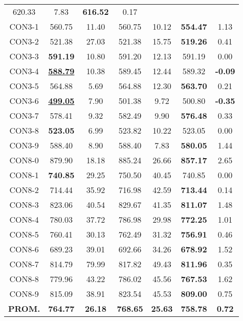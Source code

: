 \begin{table}[ht]
\begin{tabular}{c c c c c c c}
620.33 & 7.83 & \bf{616.52} & 
0.17\\CON3-1 & 560.75 & 11.40 & 
560.75 & 10.12 & \bf{554.47} & 
1.13\\CON3-2 & 521.38 & 27.03 & 
521.38 & 15.75 & \bf{519.26} & 
0.41\\CON3-3 & \bf{591.19} & 10.80 & 
591.20 & 12.13 & 591.19 & 0.00\\
CON3-4 & \bf{\underline{588.79}} & 10.38 & 
589.45 & 12.44 & 589.32 & 
\bf{-0.09}\\CON3-5 & 564.88 & 5.69 & 
564.88 & 12.30 & \bf{563.70} & 
0.21\\CON3-6 & \bf{\underline{499.05}} & 7.90 & 
501.38 & 9.72 & 500.80 & 
\bf{-0.35}\\CON3-7 & 578.41 & 9.32 & 
582.49 & 9.90 & \bf{576.48} & 
0.33\\CON3-8 & \bf{523.05} & 6.99 & 
523.82 & 10.22 & 523.05 & 0.00\\
CON3-9 & 588.40 & 8.90 & 
588.40 & 7.83 & \bf{580.05} & 
1.44\\CON8-0 & 879.90 & 18.18 & 
885.24 & 26.66 & \bf{857.17} & 
2.65\\CON8-1 & \bf{740.85} & 29.25 & 
750.50 & 40.45 & 740.85 & 0.00\\
CON8-2 & 714.44 & 35.92 & 
716.98 & 42.59 & \bf{713.44} & 
0.14\\CON8-3 & 823.06 & 40.54 & 
829.67 & 41.35 & \bf{811.07} & 
1.48\\CON8-4 & 780.03 & 37.72 & 
786.98 & 29.98 & \bf{772.25} & 
1.01\\CON8-5 & 760.41 & 30.13 & 
762.49 & 31.32 & \bf{756.91} & 
0.46\\CON8-6 & 689.23 & 39.01 & 
692.66 & 34.26 & \bf{678.92} & 
1.52\\CON8-7 & 814.79 & 79.99 & 
817.82 & 49.43 & \bf{811.96} & 
0.35\\CON8-8 & 779.96 & 43.22 & 
786.02 & 45.56 & \bf{767.53} & 
1.62\\CON8-9 & 815.09 & 38.91 & 
823.54 & 45.53 & \bf{809.00} & 
0.75\\\bf{PROM.} & 
\bf{764.77} & \bf{26.18} & \bf{768.65} & \bf{25.63} & \bf{758.78} & \bf{0.72}\\[1ex]\hline
\end{tabular}
\label{table:nonlin}
\end{table} \clearpage
